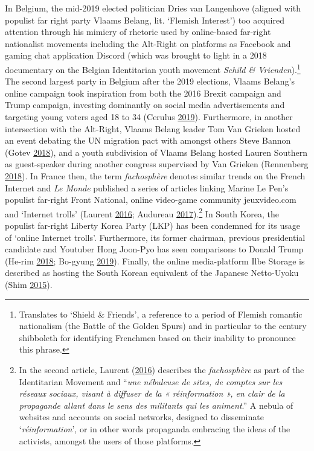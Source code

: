 \documentclass[10pt,british,A4paper,,openany]{memoir}
\begin{document}
In Belgium, the mid-2019 elected politician Dries van Langenhove
(aligned with populist far right party Vlaams Belang, lit. `Flemish
Interest') too acquired attention through his mimicry of rhetoric used
by online-based far-right nationalist movements including the Alt-Right
on platforms as Facebook and gaming chat application Discord (which was
brought to light in a 2018 documentary on the Belgian Identitarian youth
movement \emph{Schild \& Vrienden}).\footnote{Translates to `Shield \&
  Friends', a reference to a period of Flemish romantic nationalism (the
  Battle of the Golden Spurs) and in particular to the  century
  shibboleth for identifying Frenchmen based on their inability to
  pronounce this phrase.} The second largest party in Belgium after the
2019 elections, Vlaams Belang's online campaign took inspiration from
both the 2016 Brexit campaign and Trump campaign, investing dominantly
on social media advertisements and targeting young voters aged 18 to 34
(Cerulus \protect\hyperlink{ref-cerulus_inside_2019}{2019}).
Furthermore, in another intersection with the Alt-Right, Vlaams Belang
leader Tom Van Grieken hosted an event debating the UN migration pact
with amongst others Steve Bannon (Gotev
\protect\hyperlink{ref-gotev_vlaams_2018}{2018}), and a youth
subdivision of Vlaams Belang hosted Lauren Southern as guest-speaker
during another congress supervised by Van Grieken (Rennenberg
\protect\hyperlink{ref-rennenberg_vlaams_2018}{2018}). In France then,
the term \emph{fachosphère} denotes similar trends on the French
Internet and \emph{Le Monde} published a series of articles linking
Marine Le Pen's populist far-right Front National, online video-game
community jeuxvideo.com and `Internet trolls' (Laurent
\protect\hyperlink{ref-laurent_nordactu_2016}{2016}; Audureau
\protect\hyperlink{ref-audureau_les_2017}{2017}).\footnote{In the second
  article, Laurent (\protect\hyperlink{ref-laurent_nordactu_2016}{2016})
  describes the \emph{fachosphère} as part of the Identitarian Movement
  and ``\emph{une nébuleuse de sites, de comptes sur les réseaux
  sociaux, visant à diffuser de la « réinformation », en clair de la
  propagande allant dans le sens des militants qui les animent}.'' A
  nebula of websites and accounts on social networks, designed to
  disseminate `\emph{réinformation}', or in other words propaganda
  embracing the ideas of the activists, amongst the users of those
  platforms.} In South Korea, the populist far-right Liberty Korea Party
(LKP) has been condemned for its usage of `online Internet trolls'.
Furthermore, its former chairman, previous presidential candidate and
Youtuber Hong Joon-Pyo has seen comparisons to Donald Trump (He-rim
\protect\hyperlink{ref-he-rim_firebrand_2018}{2018}; Bo-gyung
\protect\hyperlink{ref-bo-gyung_youtube_2019}{2019}). Finally, the
online media-platform Ilbe Storage is described as hosting the South
Korean equivalent of the Japanese Netto-Uyoku (Shim
\protect\hyperlink{ref-shim_hardcore_2015}{2015}).
\end{document}
